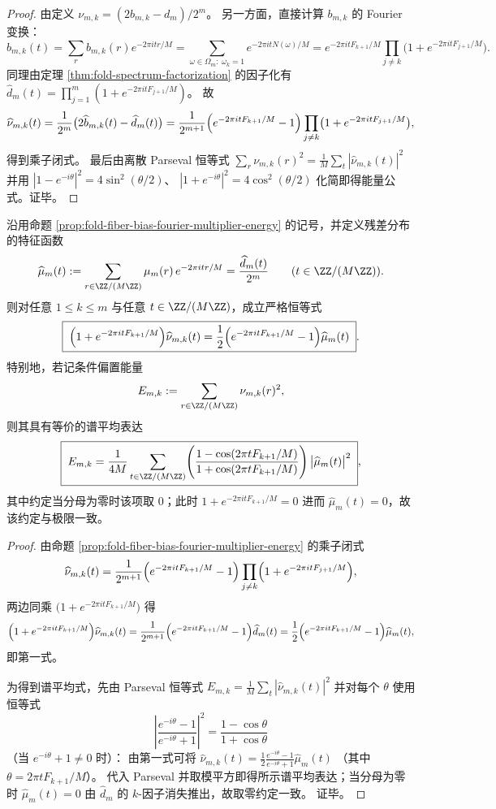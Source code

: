 \begin{proof}
由定义
\(
\nu_{m,k}=(2b_{m,k}-d_m)/2^m
\)。
另一方面，直接计算 \(b_{m,k}\) 的 Fourier 变换：
\[
\widehat b_{m,k}(t)
=\sum_{r}b_{m,k}(r)e^{-2\pi i tr/M}
=\sum_{\omega\in\Omega_m:\ \omega_k=1}e^{-2\pi i tN(\omega)/M}
=e^{-2\pi i tF_{k+1}/M}\prod_{j\ne k}\bigl(1+e^{-2\pi i tF_{j+1}/M}\bigr).
\]
同理由定理 \ref{thm:fold-spectrum-factorization} 的因子化有
\(
\widehat d_m(t)=\prod_{j=1}^m(1+e^{-2\pi i tF_{j+1}/M})
\)。
故
\[
\widehat\nu_{m,k}(t)
=\frac{1}{2^m}\bigl(2\widehat b_{m,k}(t)-\widehat d_m(t)\bigr)
=\frac{1}{2^{m+1}}\Bigl(e^{-2\pi i tF_{k+1}/M}-1\Bigr)\prod_{j\ne k}\bigl(1+e^{-2\pi i tF_{j+1}/M}\bigr),
\]
得到乘子闭式。
最后由离散 Parseval 恒等式
\(
\sum_r \nu_{m,k}(r)^2=\frac1M\sum_t|\widehat\nu_{m,k}(t)|^2
\)
并用
\(
|1-e^{-i\theta}|^2=4\sin^2(\theta/2)
\)、
\(
|1+e^{-i\theta}|^2=4\cos^2(\theta/2)
\)
化简即得能量公式。证毕。
\end{proof}

\begin{theorem}[条件偏置的频域运输恒等式与谱平均能量]\label{thm:fold-fiber-bias-frequency-transport-identity}
沿用命题 \ref{prop:fold-fiber-bias-fourier-multiplier-energy} 的记号，并定义残差分布的特征函数
\[
\widehat\mu_m(t):=\sum_{r\in\ZZ/(M\ZZ)}\mu_m(r)\,e^{-2\pi i tr/M}
=\frac{\widehat d_m(t)}{2^m}
\qquad (t\in\ZZ/(M\ZZ)).
\]
则对任意 \(1\le k\le m\) 与任意 \(t\in\ZZ/(M\ZZ)\)，成立严格恒等式
\[
\boxed{\;
\Bigl(1+e^{-2\pi i tF_{k+1}/M}\Bigr)\widehat\nu_{m,k}(t)
=\frac12\Bigl(e^{-2\pi i tF_{k+1}/M}-1\Bigr)\widehat\mu_m(t)\; }.
\]
特别地，若记条件偏置能量
\[
E_{m,k}:=\sum_{r\in\ZZ/(M\ZZ)}\nu_{m,k}(r)^2,
\]
则其具有等价的谱平均表达
\[
\boxed{\;
E_{m,k}
=\frac{1}{4M}\sum_{t\in\ZZ/(M\ZZ)}
\Biggl(\frac{1-\cos(2\pi tF_{k+1}/M)}{1+\cos(2\pi tF_{k+1}/M)}\Biggr)\,
\bigl|\widehat\mu_m(t)\bigr|^2\; } ,
\]
其中约定当分母为零时该项取 \(0\)；此时 \(1+e^{-2\pi i tF_{k+1}/M}=0\) 进而 \(\widehat\mu_m(t)=0\)，故该约定与极限一致。
\end{theorem}
\begin{proof}
由命题 \ref{prop:fold-fiber-bias-fourier-multiplier-energy} 的乘子闭式
\[
\widehat\nu_{m,k}(t)
=\frac{1}{2^{m+1}}\Bigl(e^{-2\pi i tF_{k+1}/M}-1\Bigr)
\prod_{j\ne k}\Bigl(1+e^{-2\pi i tF_{j+1}/M}\Bigr),
\]
两边同乘 \(\bigl(1+e^{-2\pi i tF_{k+1}/M}\bigr)\) 得
\[
\Bigl(1+e^{-2\pi i tF_{k+1}/M}\Bigr)\widehat\nu_{m,k}(t)
=\frac{1}{2^{m+1}}\Bigl(e^{-2\pi i tF_{k+1}/M}-1\Bigr)\widehat d_m(t)
=\frac12\Bigl(e^{-2\pi i tF_{k+1}/M}-1\Bigr)\widehat\mu_m(t),
\]
即第一式。
\par
为得到谱平均式，先由 Parseval 恒等式
\(
E_{m,k}=\frac1M\sum_t|\widehat\nu_{m,k}(t)|^2
\)
并对每个 \(\theta\) 使用恒等式
\[
\left|\frac{e^{-i\theta}-1}{e^{-i\theta}+1}\right|^2=\frac{1-\cos\theta}{1+\cos\theta}
\]
（当 \(e^{-i\theta}+1\neq 0\) 时）：
由第一式可将
\(
\widehat\nu_{m,k}(t)=\frac12\frac{e^{-i\theta}-1}{e^{-i\theta}+1}\widehat\mu_m(t)
\)
（其中 \(\theta=2\pi tF_{k+1}/M\)）。
代入 Parseval 并取模平方即得所示谱平均表达；当分母为零时 \(\widehat\mu_m(t)=0\) 由 \(\widehat d_m\) 的 \(k\)-因子消失推出，故取零约定一致。
证毕。
\end{proof}

